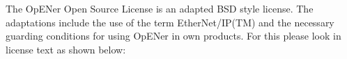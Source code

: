 \-The \-Op\-E\-Ner \-Open \-Source \-License is an adapted \-B\-S\-D style license. \-The adaptations include the use of the term \-Ether\-Net/\-I\-P(\-T\-M) and the necessary guarding conditions for using \-Op\-E\-Ner in own products. \-For this please look in license text as shown below\-:


\begin{DoxyCodeInclude}
\end{DoxyCodeInclude}
 